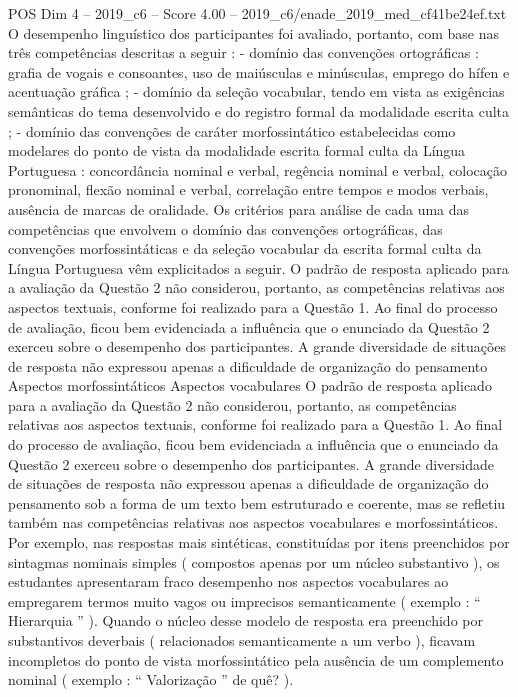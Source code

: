 \begin{textsample}{POS Dim 4 – 2019\_c6 – Score 4.00 – 2019\_c6/enade\_2019\_med\_cf41be24ef.txt}
O desempenho linguístico dos participantes foi avaliado, portanto, com base nas três competências descritas a seguir : - domínio das convenções ortográficas : grafia de vogais e consoantes, uso de maiúsculas e minúsculas, emprego do hífen e acentuação gráfica ; - domínio da seleção vocabular, tendo em vista as exigências semânticas do tema desenvolvido e do registro formal da modalidade escrita culta ; - domínio das convenções de caráter morfossintático estabelecidas como modelares do ponto de vista da modalidade escrita formal culta da Língua Portuguesa : concordância nominal e verbal, regência nominal e verbal, colocação pronominal, flexão nominal e verbal, correlação entre tempos e modos verbais, ausência de marcas de oralidade.
Os critérios para análise de cada uma das competências que envolvem o domínio das convenções ortográficas, das convenções morfossintáticas e da seleção vocabular da escrita formal culta da Língua Portuguesa vêm explicitados a seguir.
O padrão de resposta aplicado para a avaliação da Questão 2 não considerou, portanto, as competências relativas aos aspectos textuais, conforme foi realizado para a Questão 1.
Ao final do processo de avaliação, ficou bem evidenciada a influência que o enunciado da Questão 2 exerceu sobre o desempenho dos participantes.
A grande diversidade de situações de resposta não expressou apenas a dificuldade de organização do pensamento Aspectos morfossintáticos Aspectos vocabulares O padrão de resposta aplicado para a avaliação da Questão 2 não considerou, portanto, as competências relativas aos aspectos textuais, conforme foi realizado para a Questão 1.
Ao final do processo de avaliação, ficou bem evidenciada a influência que o enunciado da Questão 2 exerceu sobre o desempenho dos participantes.
A grande diversidade de situações de resposta não expressou apenas a dificuldade de organização do pensamento sob a forma de um texto bem estruturado e coerente, mas se refletiu também nas competências relativas aos aspectos vocabulares e morfossintáticos.
Por exemplo, nas respostas mais sintéticas, constituídas por itens preenchidos por sintagmas nominais simples ( compostos apenas por um núcleo substantivo ), os estudantes apresentaram fraco desempenho nos aspectos vocabulares ao empregarem termos muito vagos ou imprecisos semanticamente ( exemplo : “ Hierarquia ” ).
Quando o núcleo desse modelo de resposta era preenchido por substantivos deverbais ( relacionados semanticamente a um verbo ), ficavam incompletos do ponto de vista morfossintático pela ausência de um complemento nominal ( exemplo : “ Valorização ” de quê? ).

\end{textsample}
